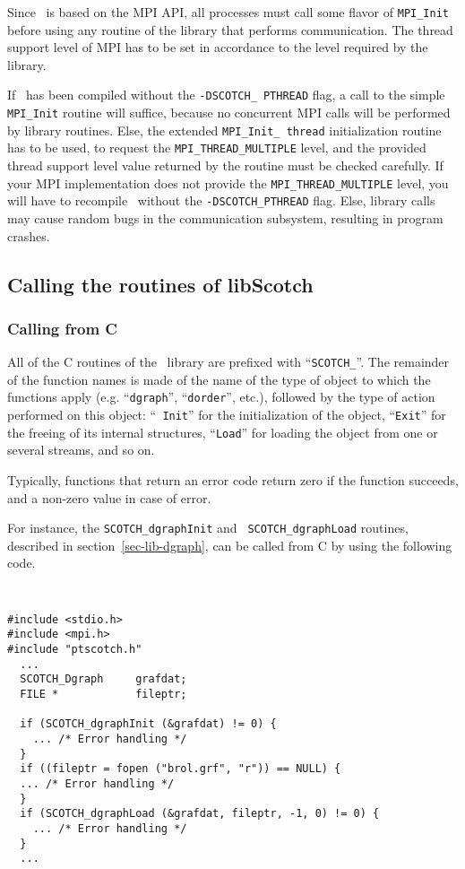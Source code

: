 Since \ptscotch\ is based on the MPI API, all processes must call some
flavor of \texttt{MPI\_\lbt Init} before using any routine of the
library that performs communication. The thread support level of MPI
has to be set in accordance to the level required by the library.

If \ptscotch\ has been compiled without the \texttt{-DSCOTCH\_\lbt
PTHREAD} flag, a call to the simple \texttt{MPI\_\lbt Init} routine
will suffice, because no concurrent MPI calls will be performed by
library routines. Else, the extended \texttt{MPI\_\lbt Init\_\lbt
thread} initialization routine has to be used, to request the
\texttt{MPI\_\lbt THREAD\_\lbt MULTIPLE} level, and the provided
thread support level value returned by the routine must be checked
carefully. If your MPI implementation does not provide the
\texttt{MPI\_\lbt THREAD\_\lbt MULTIPLE} level, you will have to
recompile \ptscotch\ without the \texttt{-DSCOTCH\_\lbt PTHREAD}
flag. Else, library calls may cause random bugs in the communication
subsystem, resulting in program crashes.

\subsection{Calling the routines of {\sc libScotch}}

\subsubsection{Calling from C}

All of the C routines of the \libscotch\ library are prefixed with
``{\tt SCOTCH\_}''. The remainder of the function names is made of the
name of the type of object to which the functions apply (e\@.g\@.
``{\tt dgraph}'', ``{\tt dorder}'', etc.),
followed by the type of action performed on this object: ``{\tt
Init}'' for the initialization of the object, ``{\tt Exit}'' for the
freeing of its internal structures, ``{\tt Load}'' for loading the
object from one or several streams, and so on.

Typically, functions that return an error code return zero if the
function succeeds, and a non-zero value in case of error.

For instance, the {\tt SCOTCH\_\lbt dgraph\lbt Init} and {\tt
SCOTCH\_\lbt dgraph\lbt Load} routines, described in
section~\ref{sec-lib-dgraph}, can be called from C by using the
following code.
{\tt
\begin{verbatim}
#include <stdio.h>
#include <mpi.h>
#include "ptscotch.h"
  ...
  SCOTCH_Dgraph     grafdat;
  FILE *            fileptr;

  if (SCOTCH_dgraphInit (&grafdat) != 0) {
    ... /* Error handling */
  }
  if ((fileptr = fopen ("brol.grf", "r")) == NULL) {
  ... /* Error handling */
  }
  if (SCOTCH_dgraphLoad (&grafdat, fileptr, -1, 0) != 0) {
    ... /* Error handling */
  }
  ...
\end{verbatim}
}

